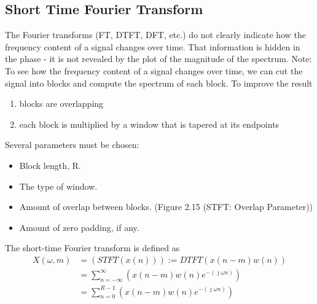 \documentclass[10pt,english]{article}
\begin{document}
\subsection{Short Time Fourier Transform}

The Fourier transforms (FT, DTFT, DFT, etc.) do not clearly indicate how the frequency content of a signal changes over time. That information is hidden in the phase - it is not revealed by the plot of the magnitude of the spectrum. Note: To see how the frequency content of a signal changes over time, we can cut the signal into blocks and compute the spectrum of each block. To improve the result
\begin{enumerate}
\item blocks are overlapping
\item each block is multiplied by a window that is tapered at its endpoints
\end{enumerate}
Several parameters must be chosen:
\begin{itemize}
\item Block length, R.
\item The type of window.
\item Amount of overlap between blocks. (Figure 2.15 (STFT: Overlap Parameter))
\item Amount of zero padding, if any.
\end{itemize}

The short-time Fourier transform is defined as
\begin{equation}
\begin{split}
X(\omega, m )& = (STFT(x(n))) := DTFT(x(n - m) w(n)) \\
&= \sum_{n = - \infty}^{\infty} (x(n - m) w(n) e^{-(\jmath \omega n)} )\\
&= \sum_{n = 0}^{R-1} (x(n - m) w(n) e^{-(\jmath \omega n)} )
\end{split}
\end{equation}
\end{document}
